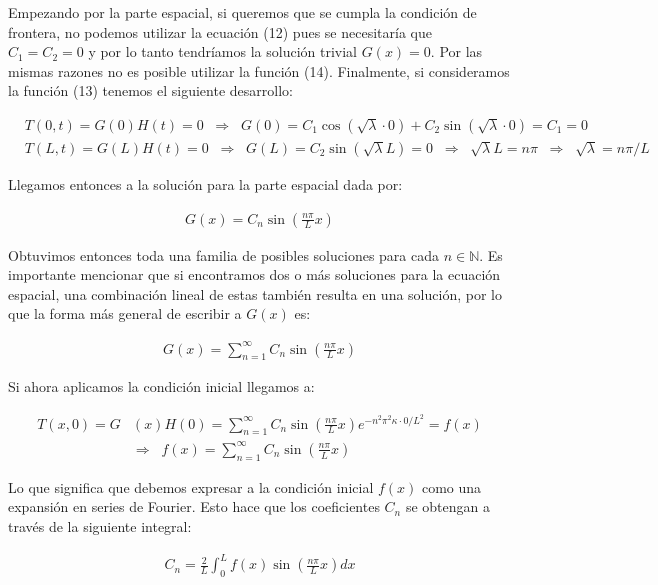 \documentclass[12pt]{article}
\begin{document}
Empezando por la parte espacial, si queremos que se cumpla la condición de frontera, no podemos utilizar la ecuación (12) pues se necesitaría que $C_1 = C_2 = 0$ y por lo tanto tendríamos la solución trivial $G(x) = 0$. Por las mismas razones no es posible utilizar la función (14). Finalmente, si consideramos la función (13) tenemos el siguiente desarrollo:

\begin{align*}
    &T(0,t) = G(0)H(t) = 0 \;\; \Rightarrow \;\; G(0) = C_1\cos(\sqrt{\lambda}\cdot 0) + C_2\sin(\sqrt{\lambda}\cdot 0) = C_1 = 0 \\
    &T(L,t) = G(L)H(t) = 0 \;\; \Rightarrow \;\; G(L) = C_2\sin(\sqrt{\lambda}L) = 0 \;\; \Rightarrow \;\; \sqrt{\lambda}L = n\pi \;\; \Rightarrow \;\; \sqrt{\lambda} = n\pi/L
\end{align*}

Llegamos entonces a la solución para la parte espacial dada por:

\begin{align*}
    G(x) = C_n\sin\left(\frac{n\pi}{L}x\right)
\end{align*}

Obtuvimos entonces toda una familia de posibles soluciones para cada $n\in \mathbb{N}$. Es importante mencionar que si encontramos dos o más soluciones para la ecuación espacial, una combinación lineal de estas también resulta en una solución, por lo que la forma más general de escribir a $G(x)$ es:

\begin{align*}
    G(x) = \sum_{n=1}^{\infty} C_n\sin\left(\frac{n\pi}{L}x\right)
\end{align*}

Si ahora aplicamos la condición inicial llegamos a:

\begin{align*}
    T(x,0) = G&(x)H(0) = \sum_{n=1}^{\infty} C_n\sin\left(\frac{n\pi}{L}x\right) e^{-n^2\pi^2\kappa \cdot 0/L^2} = f(x) \\
    &\Rightarrow \;\; f(x) = \sum_{n=1}^{\infty} C_n\sin\left(\frac{n\pi}{L}x\right)
\end{align*}

Lo que significa que debemos expresar a la condición inicial $f(x)$ como una expansión en series de Fourier. Esto hace que los coeficientes $C_n$ se obtengan a través de la siguiente integral:

\begin{align*}
    C_n = \frac{2}{L}\int_0^L f(x)\sin \left(\frac{n\pi}{L}x\right)dx 
\end{align*}
\end{document}
